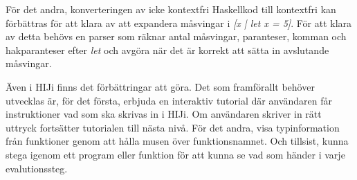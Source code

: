 För det andra, konverteringen av icke kontextfri Haskellkod till kontextfri kan förbättras 
för att klara av att expandera måsvingar i \emph{[x | let x = 5]}. 
För att klara av detta behövs en parser som räknar antal måsvingar, paranteser, 
komman och hakparanteser efter \emph{let} och avgöra när det är korrekt att sätta in avslutande måsvingar.

Även i HIJi finns det förbättringar att göra.
Det som framförallt behöver utvecklas är, för det första, erbjuda en interaktiv tutorial där användaren får instruktioner vad som ska skrivas in i HIJi. Om användaren skriver in rätt uttryck fortsätter tutorialen till nästa nivå.
För det andra, visa typinformation från funktioner genom att hålla musen över funktionsnamnet.
Och tillsist, kunna stega igenom ett program eller funktion för att kunna se vad som händer i varje evalutionssteg. 
